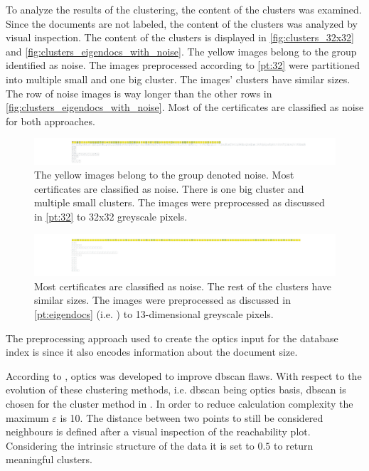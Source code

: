 To analyze the results of the clustering, the content of the clusters was examined.
Since the documents are not labeled, the content of the clusters was analyzed by visual inspection.
The content of the clusters is displayed in \autoref{fig:clusters_32x32} and \autoref{fig:clusters_eigendocs_with_noise}.
The yellow images belong to the group identified as noise.
The images preprocessed according to \autoref{pt:32} were partitioned into multiple small and one big cluster.
The \eigendocs{} images' clusters have similar sizes. 
The row of noise images is way longer than the other rows in \autoref{fig:clusters_eigendocs_with_noise}.
Most of the certificates are classified as noise for both approaches.


\begin{figure}[!htb] %
    \centering
    \includegraphics[width=1.05\textwidth]{images/OPTICS/32x32/cluster_content_32x32.pdf}
    \caption[Detailed \ac{optics} clusters using 32x32 greyscale pixels]{The yellow images belong to the group denoted noise.
    Most certificates are classified as noise.
    There is one big cluster and multiple small clusters.
    The images were preprocessed as discussed in \autoref{pt:32} to 32x32 greyscale pixels.
    }
    \label{fig:clusters_32x32}
\end{figure}

\begin{figure}[!htb] %
    \centering
    \includegraphics[width=1.05\textwidth]{images/OPTICS/eigendocs/cluster_content_incl_noise_Eigendocs.pdf}
    \caption[Detailed \ac{optics} clusters using \eigendocs{}]{Most certificates are classified as noise. The rest of the clusters have similar sizes.
    The images were preprocessed as discussed in \autoref{pt:eigendocs} (i.e. \eigendocs{}) to 13-dimensional greyscale pixels.
    }
    \label{fig:clusters_eigendocs_with_noise}
\end{figure}


The preprocessing approach used to create the \ac{optics} input for the \databaseName{} database index is \eigendocs{} 
since it also encodes information about the document size. 

According to \citeauthor{OPTICS2014}, \ac{optics} was developed to improve \ac{dbscan} flaws.
With respect to the evolution of these clustering methods, i.e. \ac{dbscan} being \ac{optics} basis, 
\ac{dbscan} is chosen for the cluster method in .
In order to reduce calculation complexity the maximum $\varepsilon$ is 10.
The distance between two points to still be considered neighbours is defined after a visual inspection of the reachability plot.
Considering the intrinsic structure of the data it is set to $0.5$ to return meaningful clusters.